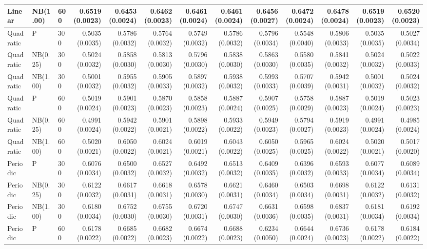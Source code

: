 \begin{table}[p]
{\begin{tabular}{lllrrrrrrrrrr}
Linear & NB(1.00) & 600 & 0.6519 (0.0023) & 0.6453 (0.0024) & 0.6462 (0.0023) & 0.6461 (0.0024) & 0.6461 (0.0024) & 0.6456 (0.0027) & 0.6472 (0.0024) & 0.6478 (0.0024) & 0.6519 (0.0023) & 0.6520 (0.0023) \\
\hline
Quadratic & P & 300 & 0.5035 (0.0035) & 0.5786 (0.0032) & 0.5764 (0.0032) & 0.5749 (0.0032) & 0.5786 (0.0032) & 0.5796 (0.0034) & 0.5548 (0.0040) & 0.5806 (0.0033) & 0.5035 (0.0035) & 0.5027 (0.0034) \\
Quadratic & NB(0.25) & 300 & 0.5024 (0.0032) & 0.5858 (0.0030) & 0.5813 (0.0030) & 0.5796 (0.0030) & 0.5838 (0.0030) & 0.5863 (0.0030) & 0.5580 (0.0035) & 0.5841 (0.0032) & 0.5024 (0.0032) & 0.5022 (0.0033) \\
Quadratic & NB(1.00) & 300 & 0.5001 (0.0032) & 0.5955 (0.0032) & 0.5905 (0.0033) & 0.5897 (0.0032) & 0.5938 (0.0032) & 0.5993 (0.0033) & 0.5707 (0.0039) & 0.5942 (0.0031) & 0.5001 (0.0032) & 0.5024 (0.0032) \\
Quadratic & P & 600 & 0.5019 (0.0024) & 0.5901 (0.0023) & 0.5870 (0.0023) & 0.5858 (0.0023) & 0.5887 (0.0024) & 0.5907 (0.0025) & 0.5758 (0.0029) & 0.5887 (0.0023) & 0.5019 (0.0024) & 0.5023 (0.0023) \\
Quadratic & NB(0.25) & 600 & 0.4991 (0.0024) & 0.5942 (0.0022) & 0.5901 (0.0021) & 0.5898 (0.0022) & 0.5933 (0.0022) & 0.5949 (0.0023) & 0.5794 (0.0027) & 0.5919 (0.0023) & 0.4991 (0.0024) & 0.4985 (0.0024) \\
Quadratic & NB(1.00) & 600 & 0.5020 (0.0021) & 0.6050 (0.0022) & 0.6024 (0.0021) & 0.6019 (0.0021) & 0.6043 (0.0022) & 0.6050 (0.0025) & 0.5965 (0.0025) & 0.6024 (0.0022) & 0.5020 (0.0021) & 0.5017 (0.0020) \\
\hline
Periodic & P & 300 & 0.6076 (0.0034) & 0.6500 (0.0032) & 0.6527 (0.0032) & 0.6492 (0.0032) & 0.6513 (0.0032) & 0.6409 (0.0035) & 0.6396 (0.0032) & 0.6593 (0.0033) & 0.6077 (0.0034) & 0.6089 (0.0034) \\
Periodic & NB(0.25) & 300 & 0.6122 (0.0032) & 0.6617 (0.0031) & 0.6618 (0.0031) & 0.6578 (0.0030) & 0.6621 (0.0031) & 0.6460 (0.0034) & 0.6503 (0.0034) & 0.6698 (0.0031) & 0.6122 (0.0032) & 0.6131 (0.0032) \\
Periodic & NB(1.00) & 300 & 0.6180 (0.0034) & 0.6752 (0.0030) & 0.6755 (0.0030) & 0.6720 (0.0031) & 0.6747 (0.0030) & 0.6631 (0.0036) & 0.6598 (0.0035) & 0.6837 (0.0031) & 0.6181 (0.0034) & 0.6192 (0.0034) \\
Periodic & P & 600 & 0.6178 (0.0022) & 0.6685 (0.0022) & 0.6682 (0.0023) & 0.6674 (0.0022) & 0.6688 (0.0023) & 0.6234 (0.0050) & 0.6644 (0.0024) & 0.6736 (0.0023) & 0.6178 (0.0022) & 0.6184 (0.0022) \\

\end{tabular}}
\end{table}
